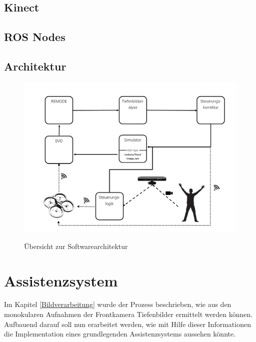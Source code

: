 \newpage
\subsection{Kinect}

\newpage
\subsection{ROS Nodes}
\newpage
\subsection{Architektur}

\begin{figure}[ht]
	\centering
	\includegraphics[scale=0.5]{Bilder/architecture.jpg}
	\label{fig:architecture}
	\caption{Übersicht zur Softwarearchitektur}
\end{figure}



\newpage
\section{Assistenzsystem}
Im Kapitel \ref{Bildverarbeitung} wurde der Prozess beschrieben, wie aus den monokularen Aufnahmen der Frontkamera Tiefenbilder ermittelt werden können. Aufbauend darauf soll nun erarbeitet werden, wie mit Hilfe dieser Informationen die Implementation eines grundlegenden Assistenzsystems aussehen könnte.


